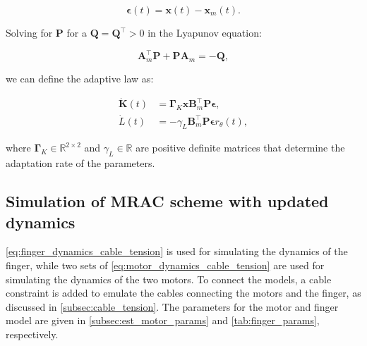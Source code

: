 \begin{equation}
    \boldsymbol{\epsilon}(t) = \mathbf{x}(t) - \mathbf{x}_m(t).
\end{equation}

Solving for $\mathbf{P}$ for a $\mathbf{Q} =\mathbf{Q}^\intercal > 0$ in the Lyapunov equation:

\begin{equation}
    \mathbf{A}_m^\intercal\mathbf{P} + \mathbf{P}\mathbf{A}_m = -\mathbf{Q},
\end{equation}

we can define the adaptive law as:

\begin{equation}
    \begin{aligned}
        \dot{\mathbf{K}}(t) &= \boldsymbol{\Gamma}_K \mathbf{x} \mathbf{B}_m^\intercal \mathbf{P} \boldsymbol{\epsilon}, \\
        \dot{L}(t) &= - \gamma_L \mathbf{B}_m^\intercal \mathbf{P} \boldsymbol{\epsilon} r_{\theta}(t),
    \end{aligned}
\end{equation}

where $\boldsymbol{\Gamma}_K \in \mathbb{R}^{2 \times 2}$ and $\gamma_L \in \mathbb{R}$ are positive definite matrices that determine the adaptation rate of the parameters. 

\subsection{Simulation of MRAC scheme with updated dynamics}

\cref{eq:finger_dynamics_cable_tension} is used for simulating the dynamics of the finger, while two sets of \cref{eq:motor_dynamics_cable_tension} are used for simulating the dynamics of the two motors. To connect the models, a cable constraint is added to emulate the cables connecting the motors and the finger, as discussed in \cref{subsec:cable_tension}. The parameters for the motor and finger model are given in \cref{subsec:est_motor_params} and \cref{tab:finger_params}, respectively. 

